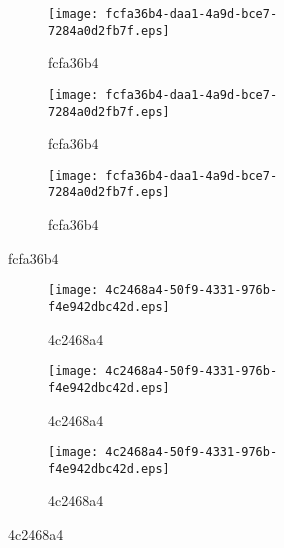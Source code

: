 \documentclass[letterpaper,11pt]{article}
\begin{document}
    \begin{figure}
        
        \begin{subfigure}{.3\textwidth}
            \texttt{[image: fcfa36b4-daa1-4a9d-bce7-7284a0d2fb7f.eps]}
            \caption{fcfa36b4}
        \end{subfigure} 
        \begin{subfigure}{.3\textwidth}
            \texttt{[image: fcfa36b4-daa1-4a9d-bce7-7284a0d2fb7f.eps]}
            \caption{fcfa36b4}
        \end{subfigure} 
        \begin{subfigure}{.3\textwidth}
            \texttt{[image: fcfa36b4-daa1-4a9d-bce7-7284a0d2fb7f.eps]}
            \caption{fcfa36b4}
        \end{subfigure} 
    \end{figure}


    \begin{figure}
        
        \begin{subfigure}{.3\textwidth}
            \texttt{[image: 4c2468a4-50f9-4331-976b-f4e942dbc42d.eps]}
            \caption{4c2468a4}
        \end{subfigure} 
        \begin{subfigure}{.3\textwidth}
            \texttt{[image: 4c2468a4-50f9-4331-976b-f4e942dbc42d.eps]}
            \caption{4c2468a4}
        \end{subfigure} 
        \begin{subfigure}{.3\textwidth}
            \texttt{[image: 4c2468a4-50f9-4331-976b-f4e942dbc42d.eps]}
            \caption{4c2468a4}
        \end{subfigure} 
    \end{figure}
\end{document}
